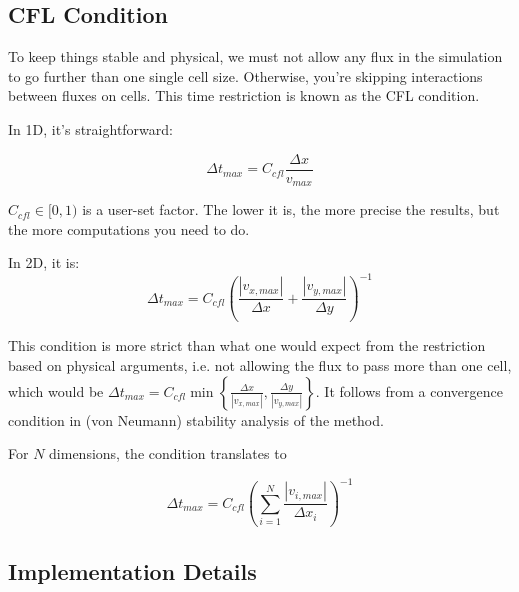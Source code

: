 \subsection{CFL Condition}

To keep things stable and physical, we must not allow any flux in the simulation to go further than one single cell size.
Otherwise, you're skipping interactions between fluxes on cells.
This time restriction is known as the CFL condition.

In 1D, it's straightforward:

\begin{equation}
	\Delta t_{max} = C_{cfl} \frac{\Delta x}{v_{max}} \label{eq:CFL1D}
\end{equation}

$C_{cfl} \in [0, 1) $ is a user-set factor.
The lower it is, the more precise the results, but the more computations you need to do.

In 2D, it is:
\begin{equation}
	\Delta t_{max} = C_{cfl} \left( \frac{|v_{x,max}|}{\Delta x} +  \frac{|v_{y,max}|}{\Delta y} \right)^{-1} \label{eq:CFL2D}
\end{equation}

This condition is more strict than what one would expect from the restriction based on physical arguments, i.e. not allowing the flux to pass more than one cell, which would be $\Delta t_{max} = C_{cfl} \min \left\{ \frac{\Delta x}{|v_{x,max}|} ,  \frac{\Delta y}{|v_{y,max}|} \right\} $.
It follows from a convergence condition in (von Neumann) stability analysis of the method.

For $N$ dimensions, the condition translates to

\begin{equation}
	\Delta t_{max} = C_{cfl} \left( \sum_{i=1}^{N} \frac{|v_{i,max}|}{\Delta x_i} \right)^{-1}  \label{eq:CFLND}
\end{equation}






















\subsection{Implementation Details}






